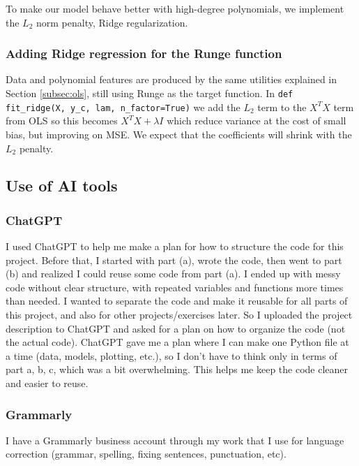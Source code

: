 \documentclass[amssymb,twocolumn,aps]{revtex4-2}
\begin{document}
To make our model behave better with high-degree polynomials, we implement the $L_2$ norm penalty, Ridge regularization. \\

\subsubsection{Adding Ridge regression for the Runge function}
 \label{subsubsec:rdg_method}

Data and polynomial features are produced by the same utilities explained in Section \ref{subsec:ols}, still using Runge as the target function. In \texttt{def fit\_ridge(X, y\_c, lam, n\_factor=True)} we add the $L_2$ term to the $X^TX$ term from OLS so this becomes $X^TX + \lambda I$ which reduce variance at the cost of small bias, but improving on MSE. We expect that the coefficients will shrink with the $L_2$ penalty. 

\subsection{Use of AI tools}
 \label{subsubsec:ai_method}
	
\subsubsection{ChatGPT}
I used ChatGPT to help me make a plan for how to structure the code for this project. Before that, I started with part (a), wrote the code, then went to part (b) and realized I could reuse some code from part (a). I ended up with messy code without clear structure, with repeated variables and functions more times than needed. I wanted to separate the code and make it reusable for all parts of this project, and also for other projects/exercises later. So I uploaded the project description to ChatGPT and asked for a plan on how to organize the code (not the actual code). ChatGPT gave me a plan where I can make one Python file at a time (data, models, plotting, etc.), so I don’t have to think only in terms of part a, b, c, which was a bit overwhelming. This helps me keep the code cleaner and easier to reuse. \\

\subsubsection{Grammarly}

I have a Grammarly business account through my work that I use for language correction (grammar, spelling, fixing sentences, punctuation, etc). 
	
\end{document}
